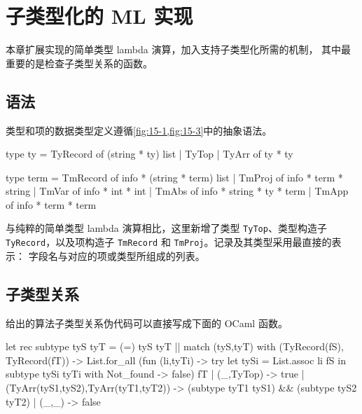 
\chapter{子类型化的 ML 实现}
\label{chap:17}

本章扩展实现的简单类型 lambda 演算，加入支持子类型化所需的机制，
其中最重要的是检查子类型关系的函数。

\section{语法}
\label{sec:17.1}

类型和项的数据类型定义遵循\cref{fig:15-1,fig:15-3}中的抽象语法。

\begin{taplocamlcode}
type ty =
    TyRecord of (string * ty) list
  | TyTop
  | TyArr of ty * ty

type term =
    TmRecord of info * (string * term) list
  | TmProj of info * term * string
  | TmVar of info * int * int
  | TmAbs of info * string * ty * term
  | TmApp of info * term * term
\end{taplocamlcode}

与纯粹的简单类型 lambda 演算相比，这里新增了类型
\texttt{TyTop}、类型构造子 \texttt{TyRecord}，以及项构造子
\texttt{TmRecord} 和 \texttt{TmProj}。记录及其类型采用最直接的表示：
字段名与对应的项或类型所组成的列表。

\section{子类型关系}
\label{sec:17.2}

给出的算法子类型关系伪代码可以直接写成下面的
OCaml 函数。

\begin{taplocamlcode}
let rec subtype tyS tyT =
  (=) tyS tyT ||
  match (tyS,tyT) with
    (TyRecord(fS), TyRecord(fT)) ->
      List.for_all
        (fun (li,tyTi) ->
          try let tySi = List.assoc li fS in
              subtype tySi tyTi
          with Not_found -> false)
        fT
  | (_,TyTop) ->
      true
  | (TyArr(tyS1,tyS2),TyArr(tyT1,tyT2)) ->
      (subtype tyT1 tyS1) && (subtype tyS2 tyT2)
  | (_,_) ->
      false
\end{taplocamlcode}

